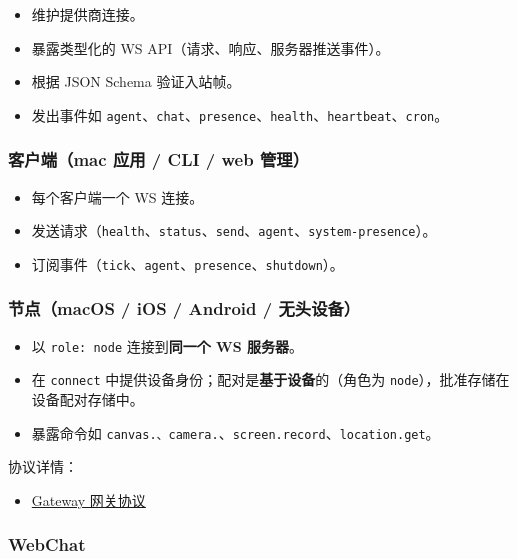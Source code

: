 \begin{itemize}
  \item 维护提供商连接。
  \item 暴露类型化的 WS API（请求、响应、服务器推送事件）。
  \item 根据 JSON Schema 验证入站帧。
  \item 发出事件如 \texttt{agent}、\texttt{chat}、\texttt{presence}、\texttt{health}、\texttt{heartbeat}、\texttt{cron}。
\end{itemize}


\subsubsection{客户端（mac 应用 / CLI / web 管理）}


\begin{itemize}
  \item 每个客户端一个 WS 连接。
  \item 发送请求（\texttt{health}、\texttt{status}、\texttt{send}、\texttt{agent}、\texttt{system-presence}）。
  \item 订阅事件（\texttt{tick}、\texttt{agent}、\texttt{presence}、\texttt{shutdown}）。
\end{itemize}


\subsubsection{节点（macOS / iOS / Android / 无头设备）}


\begin{itemize}
  \item 以 \texttt{role: node} 连接到\textbf{同一个 WS 服务器}。
  \item 在 \texttt{connect} 中提供设备身份；配对是\textbf{基于设备}的（角色为 \texttt{node}），批准存储在设备配对存储中。
  \item 暴露命令如 \texttt{canvas.\textit{}、\texttt{camera.}}、\texttt{screen.record}、\texttt{location.get}。
\end{itemize}


协议详情：

\begin{itemize}
  \item \href{/gateway/protocol}{Gateway 网关协议}
\end{itemize}


\subsubsection{WebChat}


